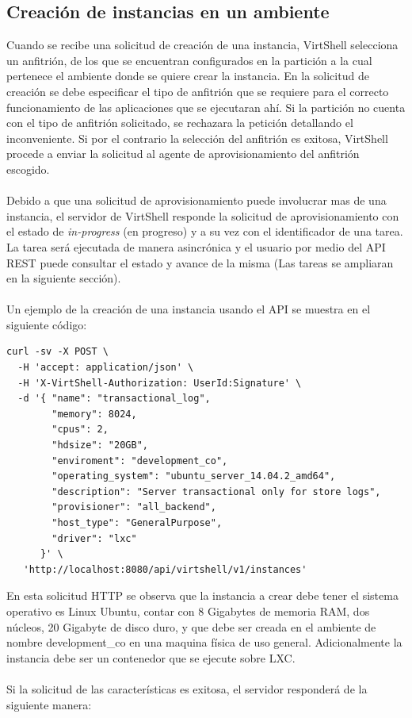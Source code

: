 \subsection{Creación de instancias en un ambiente}
Cuando se recibe una solicitud de creación de una instancia, VirtShell selecciona un anfitrión, de los que se encuentran configurados en la partición a la cual pertenece el ambiente donde se quiere crear la instancia. En la solicitud de creación se debe especificar el tipo de anfitrión que se requiere para el correcto funcionamiento de las aplicaciones que se ejecutaran ahí. Si la partición no cuenta con el tipo de anfitrión solicitado, se rechazara la petición detallando el inconveniente. Si por el contrario la selección del anfitrión es exitosa, VirtShell procede a enviar la solicitud al agente de aprovisionamiento del anfitrión escogido. \\
\\
Debido a que una solicitud de aprovisionamiento puede involucrar mas de una instancia, el servidor de VirtShell responde la solicitud de aprovisionamiento con el estado de \emph{in-progress} (en progreso) y a su vez con el identificador de una tarea. La tarea será ejecutada de manera asincrónica y el usuario por medio del API REST puede consultar el estado y avance de la misma (Las tareas se ampliaran en la siguiente sección).\\
\\
Un ejemplo de la creación de una instancia usando el API se muestra en el siguiente código:

\begin{lstlisting}[style=json, caption=Petición HTTP para crear una instancia]
curl -sv -X POST \
  -H 'accept: application/json' \
  -H 'X-VirtShell-Authorization: UserId:Signature' \
  -d '{ "name": "transactional_log",
        "memory": 8024,
        "cpus": 2,
        "hdsize": "20GB",
        "enviroment": "development_co",
        "operating_system": "ubuntu_server_14.04.2_amd64",
        "description": "Server transactional only for store logs", 
        "provisioner": "all_backend",
        "host_type": "GeneralPurpose",
        "driver": "lxc"
      }' \
   'http://localhost:8080/api/virtshell/v1/instances'
\end{lstlisting}

\vspace{5mm}

En esta solicitud HTTP se observa que la instancia a crear debe tener el  sistema operativo es Linux Ubuntu, contar con 8 Gigabytes de memoria RAM, dos núcleos, 20 Gigabyte de disco duro, y que debe ser creada en el ambiente de nombre development\_co en una maquina física de uso general. Adicionalmente la instancia debe ser un contenedor que se ejecute sobre LXC.\\
\\
Si la solicitud de las características es exitosa, el servidor responderá de la siguiente manera:

